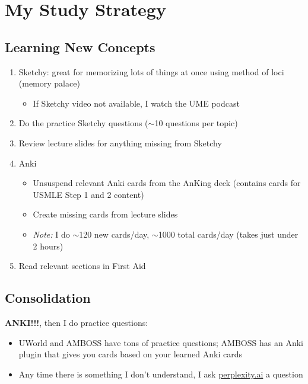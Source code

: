 \documentclass{article}
\begin{document}
\section{My Study Strategy}

\subsection{Learning New Concepts}

\begin{enumerate}
    \item Sketchy: great for memorizing lots of things at once using method of loci (memory palace)
    \begin{itemize}
        \item If Sketchy video not available, I watch the UME podcast
    \end{itemize}
    \item Do the practice Sketchy questions ($\sim$10 questions per topic)
    \item Review lecture slides for anything missing from Sketchy
    \item Anki
    \begin{itemize}
        \item Unsuspend relevant Anki cards from the AnKing deck (contains cards for USMLE Step 1 and 2 content)
        \item Create missing cards from lecture slides
        \item \textit{Note:} I do $\sim$120 new cards/day, $\sim$1000 total cards/day (takes just under 2 hours)
    \end{itemize}
    \item Read relevant sections in First Aid
\end{enumerate}

\subsection{Consolidation}

\textbf{ANKI!!!}, then I do practice questions:
\begin{itemize}
    \item UWorld and AMBOSS have tons of practice questions; AMBOSS has an Anki plugin that gives you cards based on your learned Anki cards
    \item Any time there is something I don’t understand, I ask \href{https://www.perplexity.ai/}{perplexity.ai} a question
\end{itemize}
\end{document}
